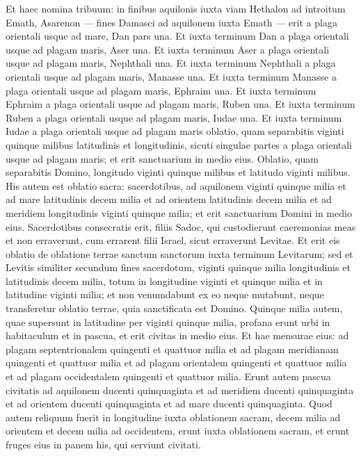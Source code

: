 \begin{biblechapter}  
\verse Et haec nomina tribuum: in finibus aquilonis iuxta viam Hethalon ad introitum Emath, Asarenon — fines Damasci ad aquilonem iuxta Emath — erit a plaga orientali usque ad mare, Dan pars una. 
\verse Et iuxta terminum Dan a plaga orientali usque ad plagam maris, Aser una. 
\verse Et iuxta terminum Aser a plaga orientali usque ad plagam maris, Nephthali una. 
\verse Et iuxta terminum Nephthali a plaga orientali usque ad plagam maris, Manasse una. 
\verse Et iuxta terminum Manasse a plaga orientali usque ad plagam maris, Ephraim una. 
\verse Et iuxta terminum Ephraim a plaga orientali usque ad plagam maris, Ruben una. 
\verse Et iuxta terminum Ruben a plaga orientali usque ad plagam maris, Iudae una.  
\verse Et iuxta terminum Iudae a plaga orientali usque ad plagam maris oblatio, quam separabitis viginti quinque milibus latitudinis et longitudinis, sicuti singulae partes a plaga orientali usque ad plagam maris; et erit sanctuarium in medio eius. 
\verse Oblatio, quam separabitis Domino, longitudo viginti quinque milibus et latitudo viginti milibus. 
\verse His autem est oblatio sacra: sacerdotibus, ad aquilonem viginti quinque milia et ad mare latitudinis decem milia et ad orientem latitudinis decem milia et ad meridiem longitudinis viginti quinque milia; et erit sanctuarium Domini in medio eius. 
\verse Sacerdotibus consecratis erit, filiis Sadoc, qui custodierunt caeremonias meas et non erraverunt, cum errarent filii Israel, sicut erraverunt Levitae. 
\verse Et erit eis oblatio de oblatione terrae sanctum sanctorum iuxta terminum Levitarum; 
\verse sed et Levitis similiter secundum fines sacerdotum, viginti quinque milia longitudinis et latitudinis decem milia, totum in longitudine viginti et quinque milia et in latitudine viginti milia; 
\verse et non venumdabunt ex eo neque mutabunt, neque transferetur oblatio terrae, quia sanctificata est Domino. 
\verse Quinque milia autem, quae supersunt in latitudine per viginti quinque milia, profana erunt urbi in habitaculum et in pascua, et erit civitas in medio eius. 
\verse Et hae mensurae eius: ad plagam septentrionalem quingenti et quattuor milia et ad plagam meridianam quingenti et quattuor milia et ad plagam orientalem quingenti et quattuor milia et ad plagam occidentalem quingenti et quattuor milia. 
\verse Erunt autem pascua civitatis ad aquilonem ducenti quinquaginta et ad meridiem ducenti quinquaginta et ad orientem ducenti quinquaginta et ad mare ducenti quinquaginta. 
\verse Quod autem reliquum fuerit in longitudine iuxta oblationem sacram, decem milia ad orientem et decem milia ad occidentem, erunt iuxta oblationem sacram, et erunt fruges eius in panem his, qui serviunt civitati. 

\end{biblechapter}
